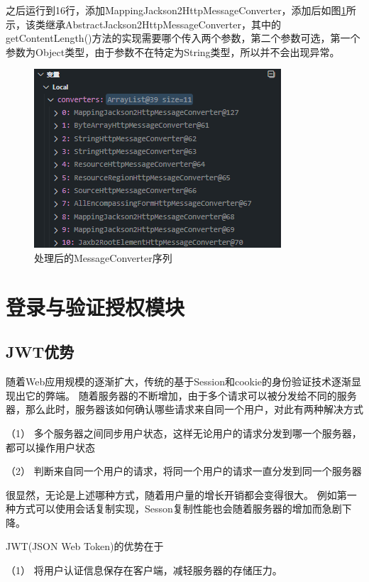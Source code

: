 之后运行到16行，添加MappingJackson2HttpMessageConverter，添加后如图\ref{MessageConverter-list-after-add}所示，该类继承AbstractJackson2HttpMessageConverter，其中的getContentLength()方法的实现需要哪个传入两个参数，第二个参数可选，第一个参数为Object类型，由于参数不在特定为String类型，所以并不会出现异常。

\begin{figure}[htbp]
  \centering
  \includegraphics[scale = 0.8]{out/figure/统一返回对象/WebMvcConfiguration-MessageConverter-debug-after-add.png}
  \caption{\song\wuhao 处理后的MessageConverter序列}
  \label{MessageConverter-list-after-add}
\end{figure}


\section{登录与验证授权模块}

\subsection{JWT优势}

随着Web应用规模的逐渐扩大，传统的基于Session和cookie的身份验证技术逐渐显现出它的弊端。
随着服务器的不断增加，由于多个请求可以被分发给不同的服务器，那么此时，服务器该如何确认哪些请求来自同一个用户，对此有两种解决方式

（1） 多个服务器之间同步用户状态，这样无论用户的请求分发到哪一个服务器，都可以操作用户状态

（2） 判断来自同一个用户的请求，将同一个用户的请求一直分发到同一个服务器

很显然，无论是上述哪种方式，随着用户量的增长开销都会变得很大。
例如第一种方式可以使用会话复制实现，Sesson复制性能也会随着服务器的增加而急剧下降。\cite{.2019h}

JWT(JSON Web Token)的优势在于

（1） 将用户认证信息保存在客户端，减轻服务器的存储压力。

